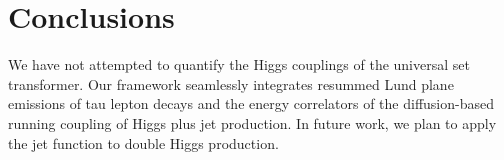 \section{Conclusions}\label{sec:conclusions}

We have not attempted to quantify the Higgs couplings of the universal
set transformer. Our framework seamlessly integrates resummed Lund plane
emissions of tau lepton decays and the energy correlators of the
diffusion-based running coupling of Higgs plus jet production. In future
work, we plan to apply the jet function to double Higgs production.


